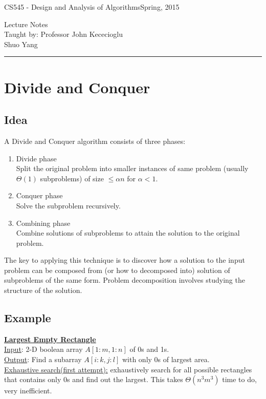 \documentclass[11pt]{article}
\def\CourseCode{CS545 - Design and Analysis of Algorithms}
\def\DateHandedOut{Spring, 2015}
\def\Professor{John Kececioglu}
\def\Author{Shuo Yang}
\begin{document}
\noindent

\CourseCode \hfill \DateHandedOut

\begin{center}
Lecture Notes\\
Taught by: Professor \Professor\\
\Author\\
\end{center}

\hrule\smallskip

\section{Divide and Conquer}
\subsection{Idea}
A Divide and Conquer algorithm consists of three phases:
\begin{enumerate}
\item Divide phase\\
Split the original problem into smaller instances of same problem
(usually $\Theta(1)$ subproblems) of size $\leq \alpha n$ for $\alpha
< 1$.
\item Conquer phase\\
Solve the subproblem recursively.
\item Combining phase\\
Combine solutions of subproblems to attain the solution to the
original problem.
\end{enumerate}

The key to applying this technique is to discover how a solution to
the input problem can be composed from (or how to decomposed into)
solution of subproblems of the same form. Problem decomposition
involves studying the structure of the solution. 

\subsection{Example}
\underline{\textbf{Largest Empty Rectangle}}\\

\underline{Input}: 2-D boolean array $A[1:m, 1:n]$ of 0s
and 1s.\\

\underline{Output}: Find a subarray $A[i:k, j:l]$ with only 0s of
largest area.\\

\underline{Exhaustive search(first attempt):} exhaustively search for
all possible rectangles that contains only 0s and find out the
largest. This takes $\Theta(n^3m^3)$ time to do, very inefficient.\\
\end{document}
